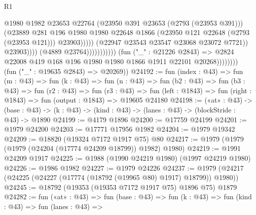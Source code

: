 \begin{lexlean}{R1}
\begin{coremodule}
                                                          @1980
                                                          @1982
                                                          @23653
                                                          @22764
                                                          (@23950 @391 @23653 (@2793 (@23953 @391)))
                                                          (@23889
                                                            @281
                                                            @196
                                                            @1980
                                                            @1980
                                                            @22648
                                                            @1866
                                                            (@23950
                                                              @121
                                                              @22648
                                                              (@2793 (@23953 @121)))
                                                            @23903)))))
                                                  (@22947 @23543 @23547 @23068 @23072 @7721))
                                                @23903))))
                                        (@4889 @23764)))))))))))
                    (fun ("_" : @21226 @2843) =>
                    @2824 @22008 @419 @168 @196 @1980 @1980 @1866 @1911 @22101 @20268))))))))
      (fun ("_" : @19635 @2843) => @20269))
@24192 := fun (index : @43) =>
  fun (m : @43) =>
  fun (k : @43) =>
  fun (n : @43) =>
  fun (b2 : @43) =>
  fun (b3 : @43) =>
  fun (r2 : @43) =>
  fun (r3 : @43) =>
  fun (left : @1843) => fun (right : @1843) => fun (output : @1843) => @19605 @24180
@24198 := («at» : @43) ->
  (base : @43) -> (k : @43) -> (kind : @43) -> (lanes : @43) -> (blockStride : @43) -> @1890
@24199 := @4179 @1896
@24200 := @17759 @24199
@24201 := @1979 @24200
@24203 := @17771 @17956 @1982
@24204 := @1979 @19342
@24209 := @18820 (@19324 @7172 @1917 @75) @80
@24217 := @1979 (@1979 (@1979 (@24204 (@17774 @24209 @18799)) @1982) @1980)
@24219 := @1991 @24209 @1917
@24225 := @1988 (@1990 @24219 @1980) (@1997 @24219 @1980)
@24226 := @1986 @1982
@24227 := @1979 @24226
@24237 := @1979 (@24217 (@24225 (@24227 (@17774 (@18792 (@19965 @80) @1917) @18799)) @1980))
@24245 := @18792 (@19353 (@19353 @7172 @1917 @75) @1896 @75) @1879
@24282 := fun («at» : @43) =>
  fun (base : @43) =>
  fun (k : @43) =>
  fun (kind : @43) =>
  fun (lanes : @43) =>

\end{coremodule}
\end{lexlean}

